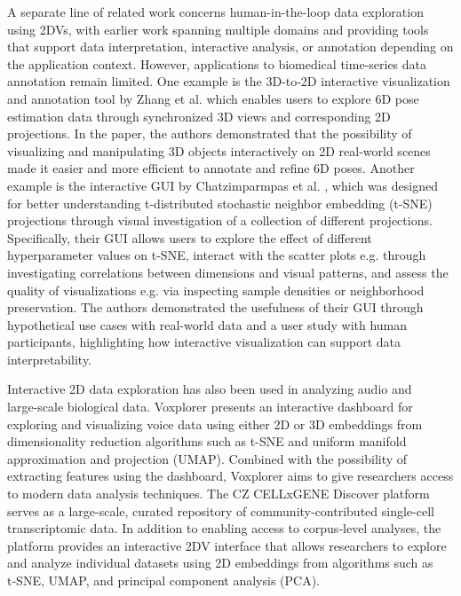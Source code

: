 \documentclass[a4paper,fleqn]{cas-dc}
\begin{document}
A separate line of related work concerns human-in-the-loop data exploration using 2DVs, with earlier work spanning multiple domains and providing tools that support data interpretation, interactive analysis, or annotation depending on the application context. However, applications to biomedical time‑series data annotation remain limited. One example is the 3D‑to‑2D interactive visualization and annotation tool by Zhang et al. \cite{vision6d} which enables users to explore 6D pose estimation data through synchronized 3D views and corresponding 2D projections. In the paper, the authors demonstrated that the possibility of visualizing and manipulating 3D objects interactively on 2D real-world scenes made it easier and more efficient to annotate and refine 6D poses. Another example is the interactive GUI by Chatzimparmpas et al. \cite{t_visne_article}, which was designed for better understanding t-distributed stochastic neighbor embedding (t-SNE) projections through visual investigation of a collection of different projections. Specifically, their GUI allows users to explore the effect of different hyperparameter values on t-SNE, interact with the scatter plots e.g. through investigating correlations between dimensions and visual patterns, and assess the quality of visualizations e.g. via inspecting sample densities or neighborhood preservation. The authors demonstrated the usefulness of their GUI through hypothetical use cases with real-world data and a user study with human participants, highlighting how interactive visualization can support data interpretability.

Interactive 2D data exploration has also been used in analyzing audio and large‑scale biological data. Voxplorer \cite{voxplorer} presents an interactive dashboard for exploring and visualizing voice data using either 2D or 3D embeddings from dimensionality reduction algorithms such as t-SNE and uniform manifold approximation and projection (UMAP). Combined with the possibility of extracting features using the dashboard, Voxplorer aims to give researchers access to modern data analysis techniques. The CZ CELLxGENE Discover platform \cite{CZ_CELLxGENE} serves as a large-scale, curated repository of community-contributed single-cell transcriptomic data. In addition to enabling access to corpus‑level analyses, the platform provides an interactive 2DV interface that allows researchers to explore and analyze individual datasets using 2D embeddings from algorithms such as t‑SNE, UMAP, and principal component analysis (PCA).
\end{document}
